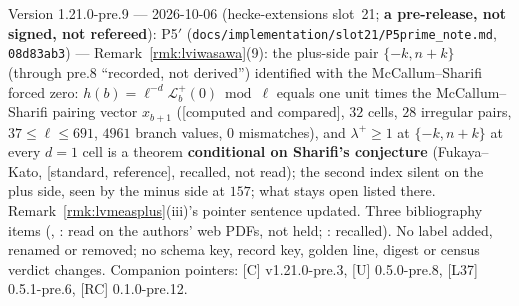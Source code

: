 \documentclass[11pt]{article}
\theoremstyle{remark}
\newcommand{\STD}{\textsf{[standard, reference]}}
\newcommand{\CMPD}{\textsf{[computed and compared]}}   %
\begin{document}
Version 1.21.0-pre.9 --- 2026-10-06 (hecke-extensions slot~21; \textbf{a pre-release, not signed, not refereed}): P5$'$ (\texttt{docs/implementation/slot21/P5prime\_note.md}, \texttt{08d83ab3}) ---
Remark~\ref{rmk:lviwasawa}(9): the plus-side pair $\{-k,n+k\}$ (through pre.8 ``recorded, not derived'') identified with the McCallum--Sharifi forced zero: $h(b)=\ell^{-d}\mathcal L^{+}_b(0)\bmod\ell$ equals one unit
times the McCallum--Sharifi pairing vector $x_{b+1}$ (\CMPD, $32$ cells, $28$ irregular pairs, $37\le\ell\le691$, $4961$ branch values, $0$ mismatches), and $\lambda^{+}\ge1$ at $\{-k,n+k\}$ at every $d=1$ cell is a theorem
\textbf{conditional on Sharifi's conjecture} (Fukaya--Kato, \STD, recalled, not read); the second index silent on the plus side, seen by the minus side at $157$; what stays open listed there.
Remark~\ref{rmk:lvmeasplus}(iii)'s pointer sentence updated. Three bibliography items (\cite{mccallum_sharifi}, \cite{sharifi_eisenstein}: read on the authors' web PDFs, not held; \cite{fukaya_kato}: recalled).
No label added, renamed or removed; no schema key, record key, golden line, digest or census verdict changes. Companion pointers: [C] v1.21.0-pre.3, [U] 0.5.0-pre.8, [L37] 0.5.1-pre.6, [RC] 0.1.0-pre.12.
\end{document}
